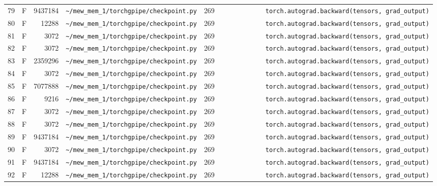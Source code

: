 \documentclass{article}
\begin{document}
\begin{longtable}{r l r p{6.5cm} r p{7.0cm}}
79 & F & 9437184 & \lstinline|~/mew_mem_1/torchgpipe/checkpoint.py| & 269 & \lstinline|            torch.autograd.backward(tensors, grad_output)| \\
80 & F & 12288 & \lstinline|~/mew_mem_1/torchgpipe/checkpoint.py| & 269 & \lstinline|            torch.autograd.backward(tensors, grad_output)| \\
81 & F & 3072 & \lstinline|~/mew_mem_1/torchgpipe/checkpoint.py| & 269 & \lstinline|            torch.autograd.backward(tensors, grad_output)| \\
82 & F & 3072 & \lstinline|~/mew_mem_1/torchgpipe/checkpoint.py| & 269 & \lstinline|            torch.autograd.backward(tensors, grad_output)| \\
83 & F & 2359296 & \lstinline|~/mew_mem_1/torchgpipe/checkpoint.py| & 269 & \lstinline|            torch.autograd.backward(tensors, grad_output)| \\
84 & F & 3072 & \lstinline|~/mew_mem_1/torchgpipe/checkpoint.py| & 269 & \lstinline|            torch.autograd.backward(tensors, grad_output)| \\
85 & F & 7077888 & \lstinline|~/mew_mem_1/torchgpipe/checkpoint.py| & 269 & \lstinline|            torch.autograd.backward(tensors, grad_output)| \\
86 & F & 9216 & \lstinline|~/mew_mem_1/torchgpipe/checkpoint.py| & 269 & \lstinline|            torch.autograd.backward(tensors, grad_output)| \\
87 & F & 3072 & \lstinline|~/mew_mem_1/torchgpipe/checkpoint.py| & 269 & \lstinline|            torch.autograd.backward(tensors, grad_output)| \\
88 & F & 3072 & \lstinline|~/mew_mem_1/torchgpipe/checkpoint.py| & 269 & \lstinline|            torch.autograd.backward(tensors, grad_output)| \\
89 & F & 9437184 & \lstinline|~/mew_mem_1/torchgpipe/checkpoint.py| & 269 & \lstinline|            torch.autograd.backward(tensors, grad_output)| \\
90 & F & 3072 & \lstinline|~/mew_mem_1/torchgpipe/checkpoint.py| & 269 & \lstinline|            torch.autograd.backward(tensors, grad_output)| \\
91 & F & 9437184 & \lstinline|~/mew_mem_1/torchgpipe/checkpoint.py| & 269 & \lstinline|            torch.autograd.backward(tensors, grad_output)| \\
92 & F & 12288 & \lstinline|~/mew_mem_1/torchgpipe/checkpoint.py| & 269 & \lstinline|            torch.autograd.backward(tensors, grad_output)| \\

\end{longtable}
\end{document}
